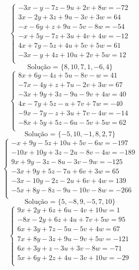 \documentclass[12pt,oneside,a4paper]{article}
\begin{document}
\vspace{\baselineskip}
\begin{equation*}
\begin{cases}
-3x-y-7z-9u+2v+8w=-72 \\
3x-2y+3z+9u-3v+3w=64 \\
-x-6y+z+9u-5v-8w=-54 \\
-x+5y-7z+3u+4v+4w=-12 \\
4x+7y-5z+4u+5v+5w=61 \\
-3x-y+4z+10u+2v+5w=12 \\
\end{cases}
\end{equation*}
\begin{equation*}
\text{Solução = }\{8,10,7,1,-6,4\}
\end{equation*}
\vspace{\baselineskip}
\begin{equation*}
\begin{cases}
8x+6y-4z+5u-8v-w=41 \\
-7x-4y+z+7u-2v+3w=67 \\
-3x+9y+3z-9u-9v+4w=40 \\
4x-7y+5z-u+7v+7w=-40 \\
-9x-7y-z+3u+7v-4w=-14 \\
-8x+5y+5z-6u-5v+5w=62 \\
\end{cases}
\end{equation*}
\begin{equation*}
\text{Solução = }\{-5,10,-1,8,2,7\}
\end{equation*}
\vspace{\baselineskip}
\begin{equation*}
\begin{cases}
-x+9y-5z+10u+5v-6w=-197 \\
-10x+10y+3z-2u-8v-4w=-189 \\
9x+9y-3z-8u-3v-9w=-125 \\
-3x+9y+5z-7u+6v+3w=65 \\
-3x-10y-2z-2u+6v+4w=139 \\
-5x+8y-8z-9u-10v-8w=-266 \\
\end{cases}
\end{equation*}
\begin{equation*}
\text{Solução = }\{5,-8,9,-5,7,10\}
\end{equation*}
\vspace{\baselineskip}
\begin{equation*}
\begin{cases}
9x+2y+6z+6u-4v+10w=1 \\
-8x-2y+6z+4u+7v+5w=95 \\
6x+3y+7z-5u-5v+4w=67 \\
7x+8y-3z+9u-9v+5w=-121 \\
6x+3y+z-3u+3v-8w=-71 \\
5x+6y+2z+4u-3v+10w=-29 \\
\end{cases}
\end{equation*}
\end{document}
